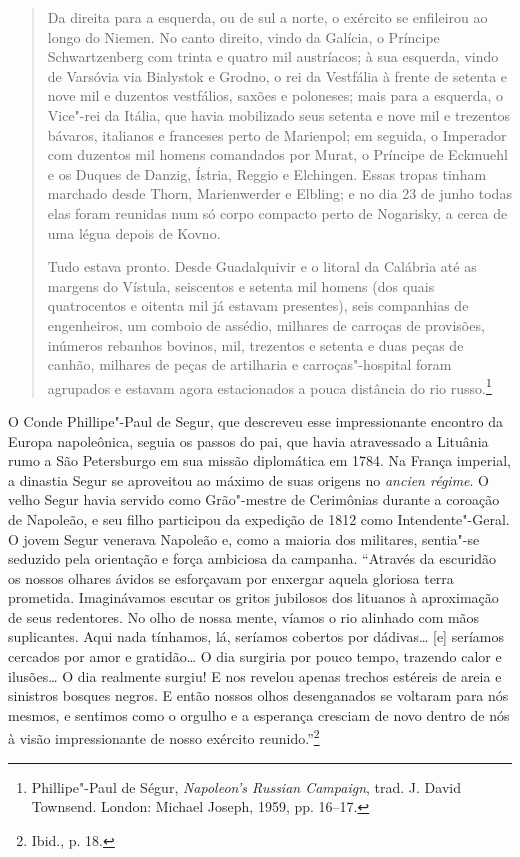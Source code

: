 \begin{quote}
Da direita para a esquerda, ou de sul a norte, o exército se enfileirou
ao longo do Niemen. No canto direito, vindo da Galícia, o Príncipe
Schwartzenberg com trinta e quatro mil austríacos; à sua esquerda, vindo
de Varsóvia via Bialystok e Grodno, o rei da Vestfália à frente de
setenta e nove mil e duzentos vestfálios, saxões e poloneses; mais para
a esquerda, o Vice"-rei da Itália, que havia mobilizado seus setenta e
nove mil e trezentos bávaros, italianos e franceses perto de Marienpol;
em seguida, o Imperador com duzentos mil homens comandados por Murat, o
Príncipe de Eckmuehl e os Duques de Danzig, Ístria, Reggio e Elchingen.
Essas tropas tinham marchado desde Thorn, Marienwerder e Elbling; e no
dia 23 de junho todas elas foram reunidas num só corpo compacto perto de
Nogarisky, a cerca de uma légua depois de Kovno.

Tudo estava pronto. Desde Guadalquivir e o litoral da Calábria até as
margens do Vístula, seiscentos e setenta mil homens (dos quais
quatrocentos e oitenta mil já estavam presentes), seis companhias de
engenheiros, um comboio de assédio, milhares de carroças de provisões,
inúmeros rebanhos bovinos, mil, trezentos e setenta e duas peças de
canhão, milhares de peças de artilharia e carroças"-hospital foram
agrupados e estavam agora estacionados a pouca distância do rio
russo.\footnote{Phillipe"-Paul de Ségur, \emph{Napoleon's Russian
  Campaign}, trad. J. David Townsend. London: Michael Joseph, 1959, pp.
  16--17.}
  \end{quote}

O Conde Phillipe"-Paul de Segur, que descreveu esse impressionante
encontro da Europa napoleônica, seguia os passos do pai, que havia
atravessado a Lituânia rumo a São Petersburgo em sua missão diplomática
em 1784. Na França imperial, a dinastia Segur se aproveitou ao máximo de
suas origens no \emph{ancien régime}. O velho Segur havia servido como
Grão"-mestre de Cerimônias durante a coroação de Napoleão, e seu filho
participou da expedição de 1812 como Intendente"-Geral. O jovem Segur
venerava Napoleão e, como a maioria dos militares, sentia"-se seduzido
pela orientação e força ambiciosa da campanha. ``Através da escuridão os
nossos olhares ávidos se esforçavam por enxergar aquela gloriosa terra
prometida. Imaginávamos escutar os gritos jubilosos dos lituanos à
aproximação de seus redentores. No olho de nossa mente, víamos o rio
alinhado com mãos suplicantes. Aqui nada tínhamos, lá, seríamos cobertos
por dádivas\ldots{} {[}e{]} seríamos cercados por amor e gratidão\ldots{} O
dia surgiria por pouco tempo, trazendo calor e ilusões\ldots{} O dia
realmente surgiu! E nos revelou apenas trechos estéreis de areia e
sinistros bosques negros. E então nossos olhos desenganados se voltaram
para nós mesmos, e sentimos como o orgulho e a esperança cresciam de
novo dentro de nós à visão impressionante de nosso exército
reunido.''\footnote{Ibid., p. 18.}

